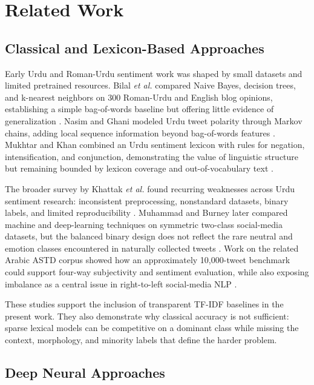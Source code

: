 \documentclass[conference]{IEEEtran}
\begin{document}
\section{Related Work}

\subsection{Classical and Lexicon-Based Approaches}

Early Urdu and Roman-Urdu sentiment work was shaped by small datasets and limited pretrained resources. Bilal \emph{et al.} compared Naive Bayes, decision trees, and k-nearest neighbors on 300 Roman-Urdu and English blog opinions, establishing a simple bag-of-words baseline but offering little evidence of generalization \cite{bilal2016roman}. Nasim and Ghani modeled Urdu tweet polarity through Markov chains, adding local sequence information beyond bag-of-words features \cite{nasim2020markov}. Mukhtar and Khan combined an Urdu sentiment lexicon with rules for negation, intensification, and conjunction, demonstrating the value of linguistic structure but remaining bounded by lexicon coverage and out-of-vocabulary text \cite{mukhtar2020lexicon}.

The broader survey by Khattak \emph{et al.} found recurring weaknesses across Urdu sentiment research: inconsistent preprocessing, nonstandard datasets, binary labels, and limited reproducibility \cite{khattak2021survey}. Muhammad and Burney later compared machine and deep-learning techniques on symmetric two-class social-media datasets, but the balanced binary design does not reflect the rare neutral and emotion classes encountered in naturally collected tweets \cite{muhammad2023innovations}. Work on the related Arabic ASTD corpus showed how an approximately 10,000-tweet benchmark could support four-way subjectivity and sentiment evaluation, while also exposing imbalance as a central issue in right-to-left social-media NLP \cite{nabil2015astd}.

These studies support the inclusion of transparent TF-IDF baselines in the present work. They also demonstrate why classical accuracy is not sufficient: sparse lexical models can be competitive on a dominant class while missing the context, morphology, and minority labels that define the harder problem.

\subsection{Deep Neural Approaches}
\end{document}

